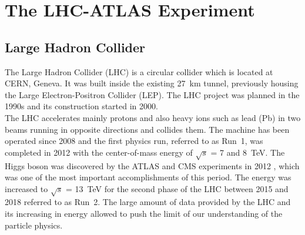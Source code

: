 \chapter{The LHC-ATLAS Experiment}
\label{chap:LHCATLAS}
\section{Large Hadron Collider}
The Large Hadron Collider (LHC) is a circular collider which is located at CERN, Geneva. It was built inside the existing 27~km tunnel, previously housing the Large Electron-Positron Collider (LEP). The LHC project was planned in the 1990s and its construction started in 2000. \\
The LHC accelerates mainly protons and also heavy ions such as lead (Pb) in two beams running in opposite directions and collides them. 
The machine has been operated since 2008 and the first physics run, referred to as Run~1, was completed in 2012 with the center-of-mass energy of $\sqrt{s}$ = 7 and 8~TeV. The Higgs boson was discovered by the ATLAS and CMS experiments in 2012 \cite{HIGG-2012-27} \cite{CMS-HIG-12-028}, which was one of the most important accomplishments of this period. The energy was increased to $\sqrt{s}$ = 13~TeV for the second phase of the LHC between 2015 and 2018 referred to as Run~2. 
The large amount of data provided by the LHC and its increasing in energy allowed to push the limit of our understanding of the particle physics. 

